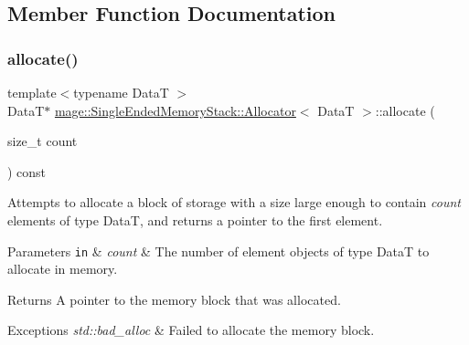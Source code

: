 \subsection{Member Function Documentation}
\hypertarget{classmage_1_1_single_ended_memory_stack_1_1_allocator_a076727a4db2bd233d80ccbc5f01b84e5}{}\label{classmage_1_1_single_ended_memory_stack_1_1_allocator_a076727a4db2bd233d80ccbc5f01b84e5} 
\subsubsection{\texorpdfstring{allocate()}{allocate()}\hspace{0.1cm}{\footnotesize\ttfamily [1/2]}}
{\footnotesize\ttfamily template$<$typename DataT $>$ \\
DataT$\ast$ \hyperlink{classmage_1_1_single_ended_memory_stack_1_1_allocator}{mage\+::\+Single\+Ended\+Memory\+Stack\+::\+Allocator}$<$ DataT $>$\+::allocate (\begin{DoxyParamCaption}\item[{size\+\_\+t}]{count }\end{DoxyParamCaption}) const}

Attempts to allocate a block of storage with a size large enough to contain {\itshape count} elements of type {\ttfamily DataT}, and returns a pointer to the first element.


\begin{DoxyParams}[1]{Parameters}
\mbox{\tt in}  & {\em count} & The number of element objects of type {\ttfamily DataT} to allocate in memory. \\
\hline
\end{DoxyParams}
\begin{DoxyReturn}{Returns}
A pointer to the memory block that was allocated. 
\end{DoxyReturn}

\begin{DoxyExceptions}{Exceptions}
{\em std\+::bad\+\_\+alloc} & Failed to allocate the memory block. \\
\hline
\end{DoxyExceptions}
\hypertarget{classmage_1_1_single_ended_memory_stack_1_1_allocator_abf93dd5bfcbda5c6d11703d212c89a76}{}\label{classmage_1_1_single_ended_memory_stack_1_1_allocator_abf93dd5bfcbda5c6d11703d212c89a76} 
